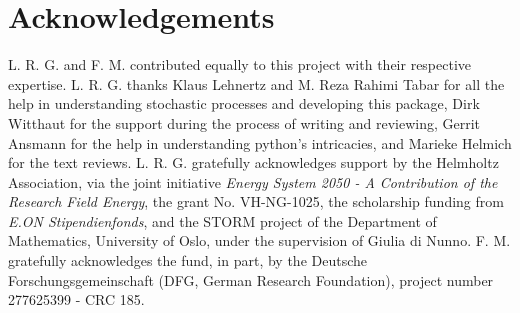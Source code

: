 \documentclass[showpacs,showkeys,10pt,onecolumn,superscriptaddress,notitlepage]{revtex4-1}
\begin{document}
\section{Acknowledgements}
L. R. G. and F. M. contributed equally to this project with their respective expertise.
L. R. G. thanks Klaus Lehnertz and M. Reza Rahimi Tabar for all the help in understanding stochastic processes and developing this package, Dirk Witthaut for the support during the process of writing and reviewing, Gerrit Ansmann for the help in understanding python's intricacies, and Marieke Helmich for the text reviews.
L. R. G. gratefully acknowledges support by the Helmholtz Association, via the joint initiative \emph{Energy System 2050 - A Contribution of the Research Field Energy}, the grant No. VH-NG-1025, the scholarship funding from \textit{E.ON Stipendienfonds}, and the STORM project of the Department of Mathematics, University of Oslo, under the supervision of Giulia di Nunno.
F. M. gratefully acknowledges the fund, in part, by the Deutsche Forschungsgemeinschaft (DFG, German Research Foundation), project number 277625399 - CRC 185.



\end{document}

